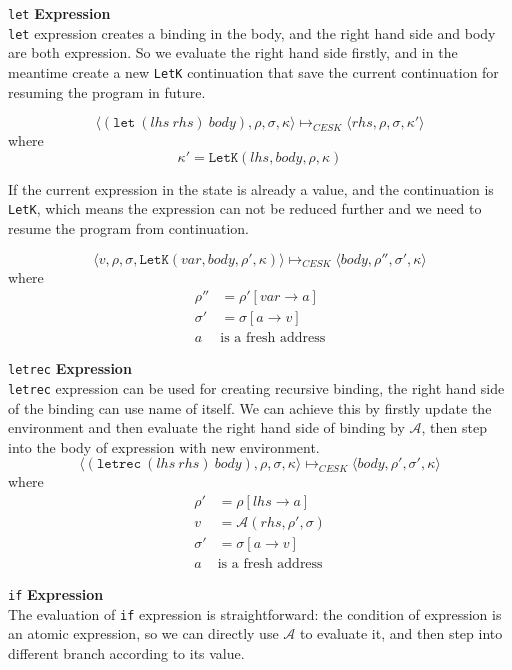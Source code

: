 \documentclass[paper=a4, fontsize=11pt]{scrartcl} %
\numberwithin{equation}{section} %
\numberwithin{figure}{section} %
\numberwithin{table}{section} %
\begin{document}
\texttt{let} \textbf{Expression}\\
\texttt{let} expression creates a binding in the body, and the right hand side and body are both expression. So we evaluate the right hand side firstly, and in the meantime create a new \texttt{LetK} continuation that save the current continuation for resuming the program in future.

$$ \langle (\texttt{let}~(lhs~rhs)~body), \rho, \sigma, \kappa \rangle \longmapsto_{CESK} \langle rhs, \rho, \sigma, \kappa' \rangle $$
where
$$ \kappa' = \texttt{LetK}(lhs, body, \rho, \kappa) $$

If the current expression in the state is already a value, and the continuation is \texttt{LetK}, which means the expression can not be reduced further and we need to resume the program from continuation.

$$ \langle v, \rho, \sigma, \texttt{LetK}(var, body, \rho', \kappa) \rangle \longmapsto_{CESK} \langle body, \rho'', \sigma', \kappa \rangle $$
where
\begin{align*}
\rho'' & = \rho'[var \rightarrow a] \\
\sigma' & = \sigma[a \rightarrow v] \\
a~&\mbox{is a fresh address}
\end{align*}

\texttt{letrec} \textbf{Expression}\\
\texttt{letrec} expression can be used for creating recursive binding, the right hand side of the binding can use name of itself. We can achieve this by firstly update the environment and then evaluate the right hand side of binding by $\mathcal{A}$, then step into the body of expression with new environment.
$$ \langle (\texttt{letrec}~(lhs~rhs)~body), \rho, \sigma, \kappa \rangle \longmapsto_{CESK} \langle body, \rho', \sigma', \kappa \rangle $$
where
\begin{align*}
\rho' & = \rho[lhs \rightarrow a] \\
v & = \mathcal{A}(rhs, \rho', \sigma) \\
\sigma' & = \sigma[a \rightarrow v] \\
a~&\mbox{is a fresh address}
\end{align*}

\texttt{if} \textbf{Expression}\\
The evaluation of \texttt{if} expression is straightforward: the condition of expression is an atomic expression, so we can directly use $\mathcal{A}$ to evaluate it, and then step into different branch according to its value.
\end{document}
